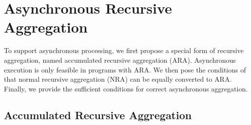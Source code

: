 

\section{Asynchronous Recursive Aggregation}

To support asynchronous processing, we first propose a special form of recursive aggregation, named accumulated recursive aggregation (ARA). Asynchronous execution is only feasible in programs with ARA. We then pose the conditions of that normal recursive aggregation (NRA) can be equally converted to ARA. Finally, we provide the sufficient conditions for correct asynchronous aggregation.

\subsection{Accumulated Recursive Aggregation}
\label{sec:async:accrec}

